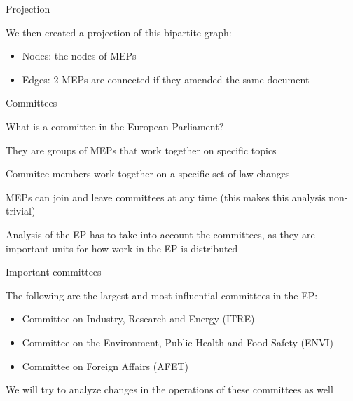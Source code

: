 \documentclass{beamer}
\begin{document}
\begin{frame}{Projection}

We then created a projection of this bipartite graph:

\begin{itemize}
	\pause \item Nodes: the nodes of MEPs
	\pause \item Edges: 2 MEPs are connected if they amended the same document	
\end{itemize}



\end{frame}


\begin{frame}{Committees}

	What is a committee in the European Parliament?
	
	\pause They are groups of MEPs that work together on specific topics
	
	\pause Commitee members work together on a specific set of law changes
	
	\pause MEPs can join and leave committees at any time \pause (this makes this analysis non-trivial)
	
	\vspace{2mm}
	
	\pause Analysis of the EP has to take into account the committees, as they are important units for how work in the EP is distributed
	
\end{frame}

\begin{frame}{Important committees}
	
	The following are the largest and most influential committees in the EP: \pause \begin{itemize}
		\item Committee on Industry, Research and Energy (ITRE)
		\item Committee on the Environment, Public Health and Food Safety (ENVI)
		\item Committee on Foreign Affairs (AFET)
	\end{itemize}

	\pause We will try to analyze changes in the operations of these committees as well
	
\end{frame}
\end{document}
